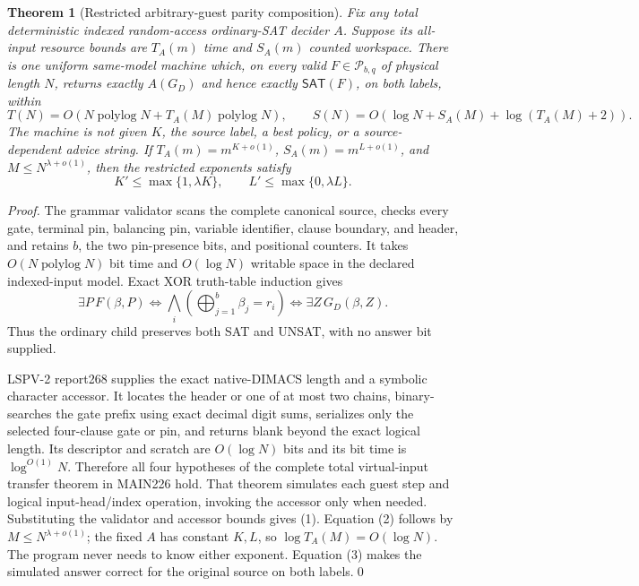\documentclass[11pt]{article}
\newtheorem{theorem}{Theorem}
\newcommand{\SAT}{\mathsf{SAT}}
\begin{document}
\begin{theorem}[Restricted arbitrary-guest parity composition]
Fix any total deterministic indexed random-access ordinary-SAT decider $A$.
Suppose its all-input resource bounds are $T_A(m)$ time and $S_A(m)$ counted
workspace.  There is one uniform same-model machine which, on every valid
$F\in\mathcal P_{b,q}$ of physical length $N$, returns exactly $A(G_D)$ and
hence exactly $\SAT(F)$, on both labels, within
\[
 T(N)=O\!\left(N\operatorname{polylog}N+
 T_A(M)\operatorname{polylog}N\right),
 \qquad
 S(N)=O\!\left(\log N+S_A(M)+\log(T_A(M)+2)\right).
 \tag{1}
\]
The machine is not given $K$, the source label, a best policy, or a source-
dependent advice string.  If $T_A(m)=m^{K+o(1)}$, $S_A(m)=m^{L+o(1)}$, and
$M\le N^{\lambda+o(1)}$, then the restricted exponents satisfy
\[
 K'\le\max\{1,\lambda K\},\qquad
 L'\le\max\{0,\lambda L\}. \tag{2}
\]
\end{theorem}
\begin{proof}
The grammar validator scans the complete canonical source, checks every gate,
terminal pin, balancing pin, variable identifier, clause boundary, and header,
and retains $b$, the two pin-presence bits, and positional counters.  It takes
$O(N\operatorname{polylog}N)$ bit time and $O(\log N)$ writable space in the
declared indexed-input model.  Exact XOR truth-table induction gives
\[
 \exists P\,F(\beta,P)
 \iff \bigwedge_i\left(\bigoplus_{j=1}^b\beta_j=r_i\right)
 \iff \exists Z\,G_D(\beta,Z).
 \tag{3}
\]
Thus the ordinary child preserves both SAT and UNSAT, with no answer bit
supplied.

LSPV-2 report268 supplies the exact native-DIMACS length and a symbolic
character accessor.  It locates the header or one of at most two chains,
binary-searches the gate prefix using exact decimal digit sums, serializes only
the selected four-clause gate or pin, and returns blank beyond the exact
logical length.  Its descriptor and scratch are $O(\log N)$ bits and its bit
time is $\log^{O(1)}N$.  Therefore all four hypotheses of the complete total
virtual-input transfer theorem in MAIN226 hold.  That theorem simulates each
guest step and logical input-head/index operation, invoking the accessor only
when needed.  Substituting the validator and accessor bounds gives (1).
Equation (2) follows by $M\le N^{\lambda+o(1)}$; the fixed $A$ has constant
$K,L$, so $\log T_A(M)=O(\log N)$.  The program never needs to know either
exponent.  Equation (3) makes the simulated answer correct for the original
source on both labels.\qed
\end{proof}
\end{document}
